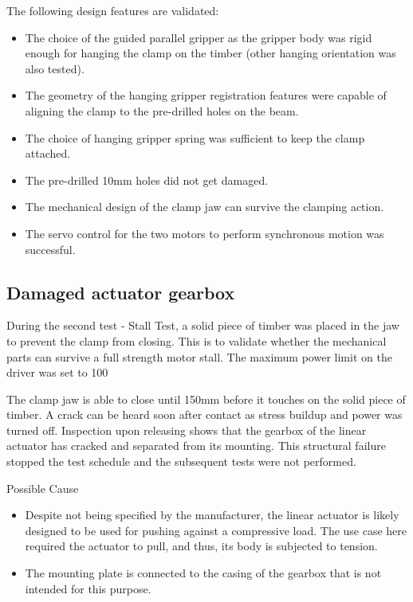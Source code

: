 The following design features are validated:
\begin{itemize}
    \item The choice of the guided parallel gripper as the gripper body was rigid enough for hanging the clamp on the timber (other hanging orientation was also tested).
    \item The geometry of the hanging gripper registration features were capable of aligning the clamp to the pre-drilled holes on the beam.
    \item The choice of hanging gripper spring was sufficient to keep the clamp attached.
    \item The pre-drilled 10mm holes did not get damaged.
    \item The mechanical design of the clamp jaw can survive the clamping action.
    \item The servo control for the two motors to perform synchronous motion was successful.
\end{itemize}

\subsection{Damaged actuator gearbox}

During the second test - Stall Test, a solid piece of timber was placed in the jaw to prevent the clamp from closing. This is to validate whether the mechanical parts can survive a full strength motor stall. The maximum power limit on the driver was set to 100%

The clamp jaw is able to close until 150mm before it touches on the solid piece of timber. A crack can be heard soon after contact as stress buildup and power was turned off. Inspection upon releasing shows that the gearbox of the linear actuator has cracked and separated from its mounting. This structural failure stopped the test schedule and the subsequent tests were not performed.

Possible Cause
\begin{itemize}
    \item Despite not being specified by the manufacturer, the linear actuator is likely designed to be used for pushing against a compressive load. The use case here required the actuator to pull, and thus, its body is subjected to tension. 
    \item The mounting plate is connected to the casing of the gearbox that is not intended for this purpose.
\end{itemize}

